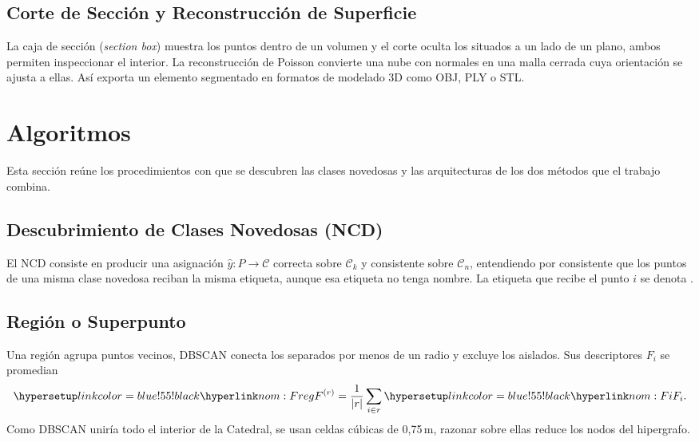 \subsection{Corte de Sección y Reconstrucción de Superficie}
\label{sec:caja}

La caja de sección (\emph{section box}) muestra los puntos dentro de un volumen y el
corte oculta los situados a un lado de un plano, ambos permiten inspeccionar el
interior. La reconstrucción de Poisson convierte una nube con normales en una malla
cerrada cuya orientación se ajusta a ellas. Así exporta un elemento segmentado en
formatos de modelado 3D como OBJ, PLY o STL.

\section{Algoritmos}
\label{sec:algoritmos}

Esta sección reúne los procedimientos con que se descubren las clases
novedosas y las arquitecturas de los dos métodos que el trabajo combina.

\subsection{Descubrimiento de Clases Novedosas (NCD)}
\label{sec:ncd}

El NCD consiste en producir una asignación $\hat{y}:P\rightarrow\mathcal{C}$
correcta sobre $\mathcal{C}_k$ y consistente sobre $\mathcal{C}_n$, entendiendo
por consistente que los puntos de una misma clase novedosa reciban la misma
etiqueta, aunque esa etiqueta no tenga nombre. La etiqueta que recibe el punto
$i$ se denota . 

\subsection{Región o Superpunto}
\label{sec:region}

Una región agrupa puntos vecinos, DBSCAN conecta los separados por menos de un
radio y excluye los aislados. Sus descriptores $F_i$ se promedian
\begin{equation}
\nom{Freg}{F^{(r)}}=\frac{1}{|r|}\sum_{i\in r}\nom{Fi}{F_i}.
\label{eq:reg-prom}
\end{equation}
Como DBSCAN uniría todo el interior de la Catedral, se usan celdas cúbicas de
0{,}75\,m, razonar sobre ellas reduce los nodos del hipergrafo.

